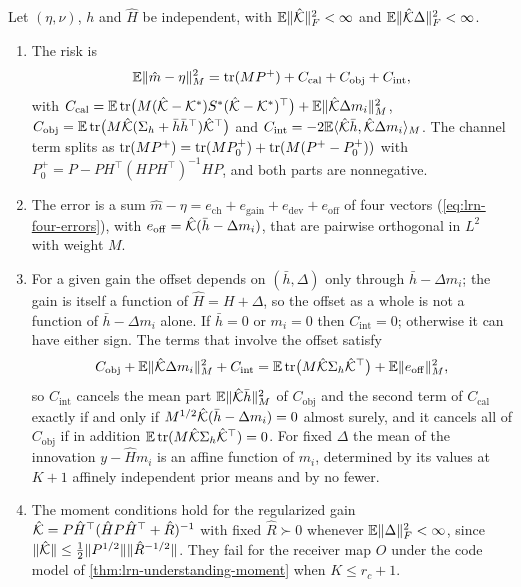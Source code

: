 \begin{theorem}\label{thm:lrn-risk-decomposition}
Let $(\eta,\nu)$, $h$ and $\hat H$ be independent, with $\mathbb{E}\Vert\hat{\mathcal{K}}\Vert_F^2<\infty$ and $\mathbb{E}\Vert\hat{\mathcal{K}}\Delta\Vert_F^2<\infty$.
\begin{enumerate}
\item[(a)] The risk is
\begin{equation}\label{eq:lrn-risk-decomposition}
\mathbb{E}\Vert\hat m-\eta\Vert_M^2=\operatorname{tr}(MP^+)+C_{\mathrm{cal}}+C_{\mathrm{obj}}+C_{\mathrm{int}},
\end{equation}
with $C_{\mathrm{cal}}=\mathbb{E}\operatorname{tr}\bigl(M(\hat{\mathcal{K}}-\mathcal{K}^\ast)S^\ast(\hat{\mathcal{K}}-\mathcal{K}^\ast)^\top\bigr)+\mathbb{E}\Vert\hat{\mathcal{K}}\Delta m_i\Vert_M^2$, $C_{\mathrm{obj}}=\mathbb{E}\operatorname{tr}\bigl(M\hat{\mathcal{K}}(\Sigma_h+\bar h\bar h^\top)\hat{\mathcal{K}}^\top\bigr)$ and $C_{\mathrm{int}}=-2\mathbb{E}\langle\hat{\mathcal{K}}\bar h,\hat{\mathcal{K}}\Delta m_i\rangle_M$. The channel term splits as $\operatorname{tr}(MP^+)=\operatorname{tr}(MP^+_0)+\operatorname{tr}(M(P^+-P^+_0))$ with $P^+_0=P-PH^\top(HPH^\top)^{-1}HP$, and both parts are nonnegative.
\item[(b)] The error is a sum $\hat m-\eta=e_{\mathrm{ch}}+e_{\mathrm{gain}}+e_{\mathrm{dev}}+e_{\mathrm{off}}$ of four vectors (\cref{eq:lrn-four-errors}), with $e_{\mathrm{off}}=\hat{\mathcal{K}}(\bar h-\Delta m_i)$, that are pairwise orthogonal in $L^2$ with weight $M$.
\item[(c)] For a given gain the offset depends on $(\bar h,\Delta)$ only through $\bar h-\Delta m_i$; the gain is itself a function of $\hat H=H+\Delta$, so the offset as a whole is not a function of $\bar h-\Delta m_i$ alone. If $\bar h=0$ or $m_i=0$ then $C_{\mathrm{int}}=0$; otherwise it can have either sign. The terms that involve the offset satisfy
\begin{equation}\label{eq:lrn-offset-identity}
C_{\mathrm{obj}}+\mathbb{E}\Vert\hat{\mathcal{K}}\Delta m_i\Vert_M^2+C_{\mathrm{int}}=\mathbb{E}\operatorname{tr}\bigl(M\hat{\mathcal{K}}\Sigma_h\hat{\mathcal{K}}^\top\bigr)+\mathbb{E}\Vert e_{\mathrm{off}}\Vert_M^2,
\end{equation}
so $C_{\mathrm{int}}$ cancels the mean part $\mathbb{E}\Vert\hat{\mathcal{K}}\bar h\Vert_M^2$ of $C_{\mathrm{obj}}$ and the second term of $C_{\mathrm{cal}}$ exactly if and only if $M^{1/2}\hat{\mathcal{K}}(\bar h-\Delta m_i)=0$ almost surely, and it cancels all of $C_{\mathrm{obj}}$ if in addition $\mathbb{E}\operatorname{tr}(M\hat{\mathcal{K}}\Sigma_h\hat{\mathcal{K}}^\top)=0$. For fixed $\Delta$ the mean of the innovation $y-\hat Hm_i$ is an affine function of $m_i$, determined by its values at $K+1$ affinely independent prior means and by no fewer.
\item[(d)] The moment conditions hold for the regularized gain $\hat{\mathcal{K}}=P\hat H^\top(\hat HP\hat H^\top+\hat R)^{-1}$ with fixed $\hat R\succ0$ whenever $\mathbb{E}\Vert\Delta\Vert_F^2<\infty$, since $\Vert\hat{\mathcal{K}}\Vert\le\tfrac12\Vert P^{1/2}\Vert\Vert\hat R^{-1/2}\Vert$. They fail for the receiver map $O$ under the code model of \cref{thm:lrn-understanding-moment} when $K\le r_c+1$.
\end{enumerate}
\end{theorem}

